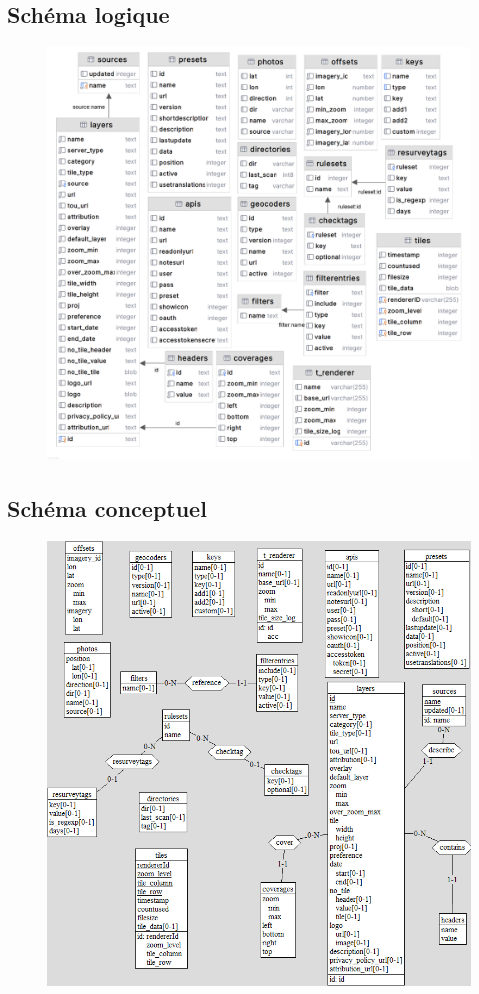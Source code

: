 \subsection{Schéma logique}
\begin{figure}[!ht]
    \centering
    \includegraphics[scale=1]{images/schema_logique.png}
    \label{fig:schéma logique}
\end{figure}

\newpage
\subsection{Schéma conceptuel}
\begin{figure}[!ht]
    \centering
    \includegraphics[scale=0.7]{images/schema_conceptuel.png}
    \label{fig:schéma conceptuel}
\end{figure}